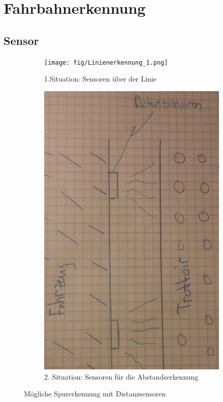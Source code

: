 
\section{Fahrbahnerkennung}


\subsection{Sensor}

\begin{figure} [hbp]
	\centering
	\begin{subfigure}[b]{0.4\textwidth}
		\texttt{[image: fig/Linienerkennung\_1.png]}
		\caption{1.Situation: Sensoren über der Linie}
	\end{subfigure}
	\hfill
	\begin{subfigure}[b]{0.36\textwidth}
		\includegraphics[width=\textwidth]{fig/Trottoirerkennung_1.png}
		\caption{2. Situation: Sensoren für die Abstandserkennung}
\end{subfigure}
	\caption{Mögliche Spurerkennung mit Distanzsensoren}\label{fig:animals}
\end{figure}



